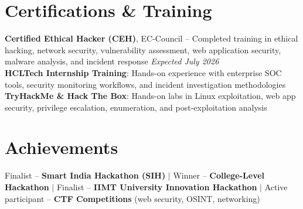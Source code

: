 \documentclass[letterpaper,10pt]{article}
\begin{document}
\section{Certifications \& Training}
 \begin{itemize}[leftmargin=0.15in, label={}]
    \small{\item{
     \textbf{Certified Ethical Hacker (CEH)}{, EC-Council -- Completed training in ethical hacking, network security, vulnerability assessment, web application security, malware analysis, and incident response \hfill \textit{Expected July 2026}} \\
     \textbf{HCLTech Internship Training}{: Hands-on experience with enterprise SOC tools, security monitoring workflows, and incident investigation methodologies} \\
     \textbf{TryHackMe \& Hack The Box}{: Hands-on labs in Linux exploitation, web app security, privilege escalation, enumeration, and post-exploitation analysis}
    }}
 \end{itemize}

\section{Achievements}
 \begin{itemize}[leftmargin=0.15in, label={}]
    \small{\item{
     Finalist -- \textbf{Smart India Hackathon (SIH)} $|$
     Winner -- \textbf{College-Level Hackathon} $|$
     Finalist -- \textbf{IIMT University Innovation Hackathon} $|$
     Active participant -- \textbf{CTF Competitions} (web security, OSINT, networking)
    }}
 \end{itemize}

\end{document}
